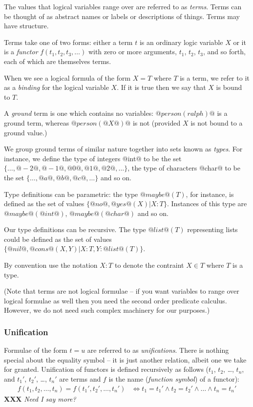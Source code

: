 \documentclass[a4paper,11pt,notitlepage,onecolumn]{article}
\newcommand{\XXX}[1]%
{{\small\textbf{XXX} \emph{#1}}}
\newcommand{\Conj}%
{\wedge}
\newcommand{\Eqv}%
{\Leftrightarrow}
\begin{document}
The values that logical variables range over are referred to as
\emph{terms}.  Terms can be thought of as abstract names or labels or
descriptions of things.  Terms may have structure.

Terms take one of two forms: either a term $t$ is an ordinary logic
variable $X$ or it is a \emph{functor} $f(t_1, t_2, t_3, \ldots)$
with zero or more arguments, $t_1$, $t_2$, $t_3$, and so forth, each of
which are themselves terms.

When we see a logical formula of the form $X = T$ where $T$ is a term,
we refer to it as a \emph{binding} for the logical variable $X$.  If it
is true then we say that $X$ is bound to $T$.

A \emph{ground} term is one which contains no variables:
$@person(ralph)@$ is a ground term, whereas $@person(@X@)@$ is not
(provided $X$ is not bound to a ground value.)

We group ground terms of similar nature together into sets known as
\emph{types}.  For instance, we define the type of integers @int@ to
be the set $\{\ldots, @-2@, @-1@, @0@, @1@, @2@, \ldots\}$, the type of
characters @char@ to be the set $\{\ldots, @a@, @b@, @c@, \ldots\}$ and
so on.

Type definitions can be parametric: the type $@maybe@(T)$, for
instance, is defined as the set of values $\{@no@, @yes@(X) | X:T\}$.
Instances of this type are $@maybe@(@int@)$, $@maybe@(@char@)$ and so on.

Our type definitions can be recursive.  The type $@list@(T)$
representing lists could be defined as the set of values
$\{@nil@, @cons@(X, Y) | X:T, Y:@list@(T)\}$.

By convention use the notation $X:T$ to denote the contraint
$X \in T$ where $T$ is a type.

(Note that terms are not logical formulae -- if you want variables to
range over logical formulae as well then you need the second order
predicate calculus.  However, we do not need such complex machinery for
our purposes.)

\subsubsection{Unification}

Formulae of the form $t = u$ are referred to as \emph{unifications}.
There is nothing special about the equality symbol -- it is just another
relation, albeit one we take for granted.  Unification of functors is
defined recursively as follows ($t_1$, $t_2$, \ldots, $t_n$, and $t_1'$,
$t_2'$, \ldots, $t_n'$ are terms and $f$ is the name (\emph{function
symbol}) of a functor):
\begin{align*}
f(t_1, t_2, \ldots, t_n) = f(t_1', t_2', \ldots, t_n')
& \Eqv t_1 = t_1' \Conj t_2 = t_2' \Conj \ldots \Conj t_n = t_n'
\end{align*}
\XXX{Need I say more?}
\end{document}
